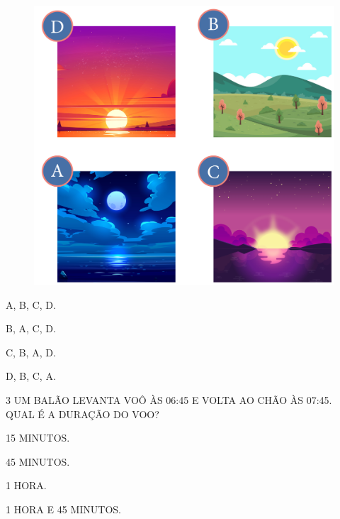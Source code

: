 
\begin{figure}[htpb!]
\centering
\includegraphics[width=.6\textwidth]{../ilustracoes/MAT1/SAEB_1ANO_MAT_FIGURA62.png}
\end{figure}

\begin{minipage}{.5\textwidth}
\begin{escolha}
\item A, B, C, D.

\item B, A, C, D.

\item C, B, A, D.

\item D, B, C, A.
\end{escolha}
\end{minipage}

\num{3} UM BALÃO LEVANTA VOÔ ÀS 06:45 E VOLTA AO CHÃO ÀS 07:45. QUAL É A DURAÇÃO DO VOO?

\begin{escolha}
\item 15 MINUTOS.

\item 45 MINUTOS.

\item 1 HORA.

\item 1 HORA E 45 MINUTOS.
\end{escolha}

